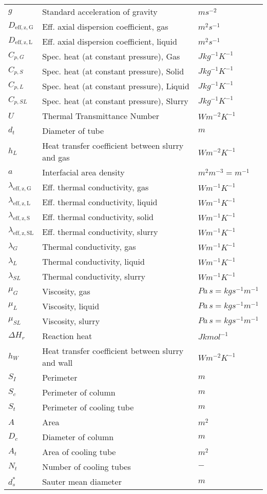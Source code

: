 \documentclass{article}
\begin{document}
\begin{center}
\begin{longtable}{lll}
			$g$ & Standard acceleration of gravity & $ms^{-2}$\\
			$D_{\mathrm{eff,z,G}}$ & Eff. axial dispersion coefficient, gas & $m^2s^{-1}$\\
			$D_{\mathrm{eff,z,L}}$ & Eff. axial dispersion coefficient, liquid & $m^2s^{-1}$\\
			$C_{p,G}$ & Spec. heat (at constant pressure), Gas & $J kg^{-1} K^{-1}$ \\
			$C_{p,S}$ & Spec. heat (at constant pressure), Solid & $J kg^{-1}  K^{-1}$\\
			$C_{p,L}$ & Spec. heat (at constant pressure), Liquid & $J kg^{-1}  K^{-1}$\\
			$C_{p,SL}$ & Spec. heat (at constant pressure), Slurry & $J kg^{-1}  K^{-1}$\\
			$U$ & Thermal Transmittance Number & $Wm^{-2}K^{-1}$ \\
			$d_t$ & Diameter of tube & $m$ \\
			$h_L$ & Heat transfer coefficient between slurry and gas & $W m^{-2}K^{-1}$ \\
			$a$ & Interfacial area density & $m^2m^{-3}=m^{-1}$ \\
			$\lambda_{\mathrm{eff,z,G}}$ & Eff. thermal conductivity, gas & $W m^{-1}K^{-1}$ \\
			$\lambda_{\mathrm{eff,z,L}}$ & Eff. thermal conductivity, liquid & $W m^{-1}K^{-1}$ \\
			$\lambda_{\mathrm{eff,z,S}}$ & Eff. thermal conductivity, solid & $W m^{-1}K^{-1}$ \\
			$\lambda_{\mathrm{eff,z,SL}}$ & Eff. thermal conductivity, slurry & $W m^{-1}K^{-1}$ \\
			$\lambda_G$ & Thermal conductivity, gas & $W m^{-1}K^{-1}$ \\ 
			$\lambda_L$ & Thermal conductivity, liquid & $W m^{-1}K^{-1}$ \\
			$\lambda_{SL}$ & Thermal conductivity, slurry & $W m^{-1}K^{-1}$ \\
			$\mu_G$ & Viscosity, gas & $Pa\,s=kg s^{-1} m^{-1}$ \\
			$\mu_L$ & Viscosity, liquid & $Pa\,s=kg s^{-1} m^{-1}$ \\
			$\mu_{SL}$ & Viscosity, slurry & $Pa\,s=kg s^{-1} m^{-1}$ \\
			$\Delta H_r$ & Reaction heat & $J kmol^{-1}$ \\
			$h_W$ & Heat transfer coefficient between slurry and wall & $W m^{-2}K^{-1}$ \\
			$S_I$ & Perimeter & $m$ \\
			$S_c$ & Perimeter of column & $m$\\
			$S_t$ & Perimeter of cooling tube & $m$\\
			$A$ & Area & $m^2$ \\
			$D_c$ & Diameter of column & $m$ \\
			$A_t$ & Area of cooling tube & $m^2$ \\
			$N_t$ & Number of cooling tubes & $-$ \\
			$d_s^*$ & Sauter mean diameter & $m$ \\
	\end{longtable}
\end{center}
\end{document}
